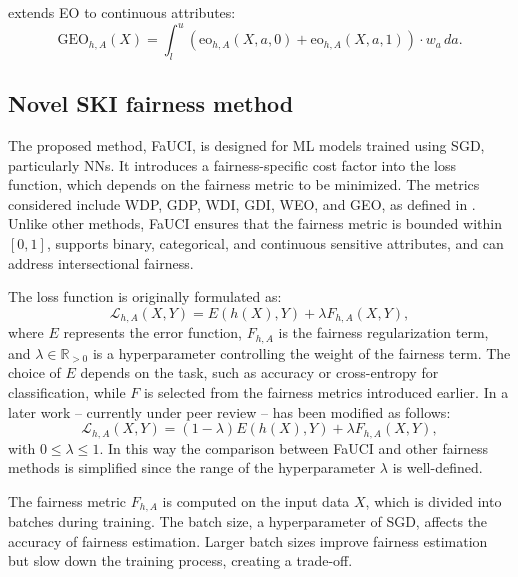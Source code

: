 extends \gls{EO} to continuous attributes:
%
\begin{equation}
    \label{eq:geo}
    \text{GEO}_{h,A}(X) = \int_{l}^{u} \left( \text{eo}_{h,A}(X, a, 0) + \text{eo}_{h,A}(X, a, 1) \right) \cdot w_a \, da.
\end{equation}



\subsection{Novel SKI fairness method}\label{subsec:novel-fairness-method}
%
The proposed method, \gls{FaUCI}, is designed for \gls{ML} models trained using \gls{SGD}, particularly \glspl{NN}.
%
It introduces a fairness-specific cost factor into the loss function, which depends on the fairness metric to be minimized.
%
The metrics considered include \gls{WDP}, \gls{GDP}, \gls{WDI}, \gls{GDI}, \gls{WEO}, and \gls{GEO}, as defined in .
%
Unlike other methods, \gls{FaUCI} ensures that the fairness metric is bounded within \([0, 1]\), supports binary, categorical, and continuous sensitive attributes, and can address intersectional fairness.

%
The loss function is originally formulated as:
%
\begin{equation}
    \label{eq:fauci_loss}
    \mathcal{L}_{h,A}(X, Y) = E(h(X), Y) + \lambda F_{h,A}(X, Y),
\end{equation}
%
where \(E\) represents the error function, \(F_{h,A}\) is the fairness regularization term, and \(\lambda \in \mathbb{R}_{>0}\) is a hyperparameter controlling the weight of the fairness term.
%
The choice of \(E\) depends on the task, such as accuracy or cross-entropy for classification, while \(F\) is selected from the fairness metrics introduced earlier.
%
In a later work -- currently under peer review --  has been modified as follows:
%
\begin{equation}
    \label{eq:fauci_loss_new}
    \mathcal{L}_{h,A}(X, Y) = (1 - \lambda) E(h(X), Y) + \lambda F_{h,A}(X, Y),
\end{equation}
%
with $0 \le \lambda \le 1$.
%
In this way the comparison between \gls{FaUCI} and other fairness methods is simplified since the range of the hyperparameter \(\lambda\) is well-defined.

%
The fairness metric \(F_{h,A}\) is computed on the input data \(X\), which is divided into batches during training.
%
The batch size, a hyperparameter of \gls{SGD}, affects the accuracy of fairness estimation.
%
Larger batch sizes improve fairness estimation but slow down the training process, creating a trade-off.


